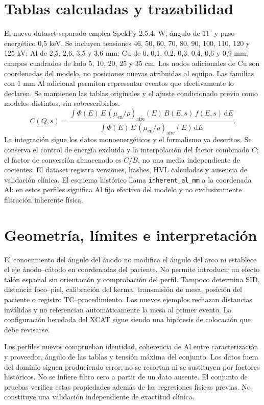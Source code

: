 \section{Tablas calculadas y trazabilidad}
El nuevo dataset separado emplea SpekPy 2.5.4, W, ángulo de $11^\circ$ y paso energético 0,5 keV. Se incluyen tensiones 46, 50, 60, 70, 80, 90, 100, 110, 120 y 125 kV; Al de 2,5, 2,6, 3,5 y 3,6 mm; Cu de 0, 0,1, 0,2, 0,3, 0,4, 0,6 y 0,9 mm; campos cuadrados de lado 5, 10, 20, 25 y 35 cm. Los nodos adicionales de Cu son coordenadas del modelo, no posiciones nuevas atribuidas al equipo. Las familias con 1 mm Al adicional permiten representar eventos que efectivamente lo declaren. Se mantienen las tablas originales y el ajuste condicionado previo como modelos distintos, sin sobrescribirlos.
\begin{equation}
C(Q,s)=\frac{\int \Phi(E)\,E\,(\mu_{\mathrm{en}}/\rho)_{\mathrm{aire}}(E)\,B(E,s)\,f(E,s)\,\mathrm dE}{\int \Phi(E)\,E\,(\mu_{\mathrm{en}}/\rho)_{\mathrm{aire}}(E)\,\mathrm dE}.
\end{equation}
La integración sigue los datos monoenergéticos y el formalismo ya descritos. Se conserva el control de energía excluida y la interpolación del factor combinado $C$; el factor de conversión almacenado es $C/B$, no una media independiente de cocientes. El dataset registra versiones, hashes, HVL calculadas y ausencia de validación clínica. El esquema histórico llama \texttt{inherent\_al\_mm} a la coordenada Al: en estos perfiles significa Al fijo efectivo del modelo y no exclusivamente filtración inherente física.

\section{Geometría, límites e interpretación}
El conocimiento del ángulo del ánodo no modifica el ángulo del arco ni establece el eje ánodo--cátodo en coordenadas del paciente. No permite introducir un efecto talón espacial sin orientación y comprobación del perfil. Tampoco determina SID, distancia foco--piel, calibración del kerma, transmisión de mesa, posición del paciente o registro TC--procedimiento. Los nuevos ejemplos rechazan distancias inválidas y no referencian automáticamente la mesa al primer evento. La configuración heredada del XCAT sigue siendo una hipótesis de colocación que debe revisarse.

Los perfiles nuevos comprueban identidad, coherencia de Al entre caracterización y proveedor, ángulo de las tablas y tensión máxima del conjunto. Los datos fuera del dominio siguen produciendo error; no se recortan ni se sustituyen por factores históricos. No se infiere filtro cero a partir de un dato ausente. El conjunto de pruebas verifica estas propiedades además de las regresiones físicas previas. No constituye una validación independiente de exactitud clínica.

